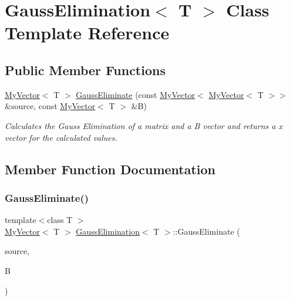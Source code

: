 \hypertarget{class_gauss_elimination}{}\section{Gauss\+Elimination$<$ T $>$ Class Template Reference}
\label{class_gauss_elimination}
\subsection*{Public Member Functions}
\begin{DoxyCompactItemize}
\item 
\mbox{\hyperlink{class_my_vector}{My\+Vector}}$<$ T $>$ \mbox{\hyperlink{class_gauss_elimination_af4df02b15566a600f527788332deaefa}{Gauss\+Eliminate}} (const \mbox{\hyperlink{class_my_vector}{My\+Vector}}$<$ \mbox{\hyperlink{class_my_vector}{My\+Vector}}$<$ T $>$$>$ \&source, const \mbox{\hyperlink{class_my_vector}{My\+Vector}}$<$ T $>$ \&B)
\begin{DoxyCompactList}\small\item\em Calculates the Gauss Elimination of a matrix and a B vector and returns a x vector for the calculated values. \end{DoxyCompactList}\end{DoxyCompactItemize}


\subsection{Member Function Documentation}
\mbox{\label{class_gauss_elimination_af4df02b15566a600f527788332deaefa}} 
\subsubsection{\texorpdfstring{GaussEliminate()}{GaussEliminate()}}
{\footnotesize\ttfamily template$<$class T $>$ \\
\mbox{\hyperlink{class_my_vector}{My\+Vector}}$<$ T $>$ \mbox{\hyperlink{class_gauss_elimination}{Gauss\+Elimination}}$<$ T $>$\+::Gauss\+Eliminate (\begin{DoxyParamCaption}\item[{const \mbox{\hyperlink{class_my_vector}{My\+Vector}}$<$ \mbox{\hyperlink{class_my_vector}{My\+Vector}}$<$ T $>$$>$ \&}]{source,  }\item[{const \mbox{\hyperlink{class_my_vector}{My\+Vector}}$<$ T $>$ \&}]{B }\end{DoxyParamCaption})}



